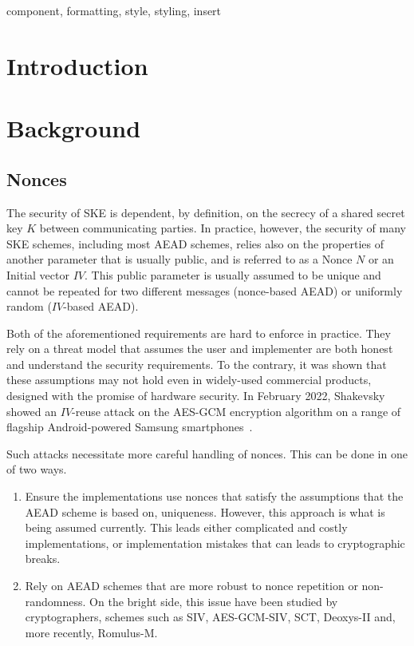 \documentclass[conference]{IEEEtran}
\begin{document}
\begin{IEEEkeywords}
component, formatting, style, styling, insert
\end{IEEEkeywords}

\section{Introduction}


\section{Background}

\subsection{Nonces}

The security of SKE is dependent, by definition, on the secrecy of a shared secret key $K$ between communicating parties. In practice, however, the security of many SKE schemes, including most AEAD schemes, relies also on the properties of another parameter that is usually public, and is referred to as a Nonce $N$ or an Initial vector $IV$. This public parameter is usually assumed to be unique and cannot be repeated for two different messages (nonce-based AEAD) or uniformly random ($IV$-based AEAD).

Both of the aforementioned requirements are hard to enforce in practice. They rely on a threat model that assumes the user and implementer are both honest and understand the security requirements. To the contrary, it was shown that these assumptions may not hold even in widely-used commercial products, designed with the promise of hardware security. In February 2022, Shakevsky \etal showed an $IV$-reuse attack on the AES-GCM encryption algorithm on a range of flagship Android-powered Samsung smartphones~\cite{}.

Such attacks necessitate more careful handling of nonces. This can be done in one of two ways.

\begin{enumerate}

\item Ensure the implementations use nonces that satisfy the assumptions that the AEAD scheme is based on, \eg uniqueness. However, this approach is what is being assumed currently. This leads either complicated and costly implementations, or implementation mistakes that can leads to cryptographic breaks.

\item Rely on AEAD schemes that are more robust to nonce repetition or non-randomness. On the bright side, this issue have been studied by cryptographers, schemes such as SIV, AES-GCM-SIV, SCT, Deoxys-II and, more recently, Romulus-M.

\end{enumerate}
\end{document}
